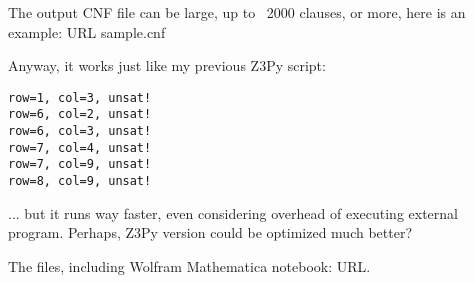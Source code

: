 

The output CNF file can be large, up to ~2000 clauses, or more, here is an example: URL sample.cnf

Anyway, it works just like my previous Z3Py script:

\begin{lstlisting}
row=1, col=3, unsat!
row=6, col=2, unsat!
row=6, col=3, unsat!
row=7, col=4, unsat!
row=7, col=9, unsat!
row=8, col=9, unsat!
\end{lstlisting}

... but it runs way faster, even considering overhead of executing external program.
Perhaps, Z3Py version could be optimized much better?

The files, including Wolfram Mathematica notebook: URL.


